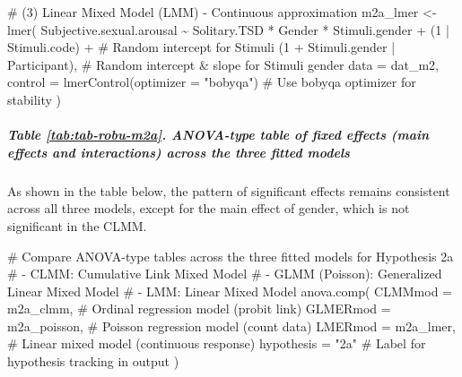 \documentclass[
  bookmarksnumbered]{article}
\newenvironment{Shaded}{\begin{snugshade}}{\end{snugshade}}
\newcommand{\AttributeTok}[1]{\textcolor[rgb]{0.80,0.80,0.80}{#1}}
\newcommand{\CommentTok}[1]{\textcolor[rgb]{0.50,0.62,0.50}{#1}}
\newcommand{\DecValTok}[1]{\textcolor[rgb]{0.86,0.86,0.80}{#1}}
\newcommand{\FunctionTok}[1]{\textcolor[rgb]{0.94,0.94,0.56}{#1}}
\newcommand{\NormalTok}[1]{\textcolor[rgb]{0.80,0.80,0.80}{#1}}
\newcommand{\OtherTok}[1]{\textcolor[rgb]{0.94,0.94,0.56}{#1}}
\newcommand{\SpecialCharTok}[1]{\textcolor[rgb]{0.86,0.64,0.64}{#1}}
\newcommand{\StringTok}[1]{\textcolor[rgb]{0.80,0.58,0.58}{#1}}
\begin{document}
\begin{Shaded}
\begin{Highlighting}[]
\CommentTok{\# (3) Linear Mixed Model (LMM) {-} Continuous approximation}
\NormalTok{m2a\_lmer }\OtherTok{\textless{}{-}} \FunctionTok{lmer}\NormalTok{(}
\NormalTok{  Subjective.sexual.arousal }\SpecialCharTok{\textasciitilde{}}\NormalTok{ Solitary.TSD }\SpecialCharTok{*}\NormalTok{ Gender }\SpecialCharTok{*}\NormalTok{ Stimuli.gender }\SpecialCharTok{+}
\NormalTok{    (}\DecValTok{1} \SpecialCharTok{|}\NormalTok{ Stimuli.code) }\SpecialCharTok{+} \CommentTok{\# Random intercept for Stimuli}
\NormalTok{    (}\DecValTok{1} \SpecialCharTok{+}\NormalTok{ Stimuli.gender }\SpecialCharTok{|}\NormalTok{ Participant), }\CommentTok{\# Random intercept \& slope for Stimuli gender}
  \AttributeTok{data =}\NormalTok{ dat\_m2,}
  \AttributeTok{control =} \FunctionTok{lmerControl}\NormalTok{(}\AttributeTok{optimizer =} \StringTok{"bobyqa"}\NormalTok{) }\CommentTok{\# Use \textquotesingle{}bobyqa\textquotesingle{} optimizer for stability}
\NormalTok{)}
\end{Highlighting}
\end{Shaded}

\subparagraph{Table \ref{tab:tab-robu-m2a}. ANOVA-type table of fixed effects (main effects and interactions) across the three fitted models}\label{table-reftabtab-robu-m2a.-anova-type-table-of-fixed-effects-main-effects-and-interactions-across-the-three-fitted-models}

As shown in the table below, the pattern of significant effects remains consistent across all three models, except for the main effect of gender, which is not significant in the CLMM.

\begin{Shaded}
\begin{Highlighting}[]
\CommentTok{\# Compare ANOVA{-}type tables across the three fitted models for Hypothesis 2a}
\CommentTok{\# {-} CLMM: Cumulative Link Mixed Model}
\CommentTok{\# {-} GLMM (Poisson): Generalized Linear Mixed Model}
\CommentTok{\# {-} LMM: Linear Mixed Model}
\FunctionTok{anova.comp}\NormalTok{(}
  \AttributeTok{CLMMmod =}\NormalTok{ m2a\_clmm, }\CommentTok{\# Ordinal regression model (probit link)}
  \AttributeTok{GLMERmod =}\NormalTok{ m2a\_poisson, }\CommentTok{\# Poisson regression model (count data)}
  \AttributeTok{LMERmod =}\NormalTok{ m2a\_lmer, }\CommentTok{\# Linear mixed model (continuous response)}
  \AttributeTok{hypothesis =} \StringTok{"2a"} \CommentTok{\# Label for hypothesis tracking in output}
\NormalTok{)}
\end{Highlighting}
\end{Shaded}
\end{document}

